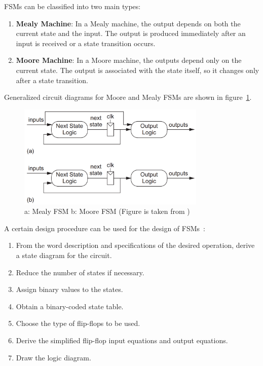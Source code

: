 \noindent
FSMs can be classified into two main types:

\begin{enumerate}
    \item \textbf{Mealy Machine}: In a Mealy machine, the output depends on both the current state and the input. The output is produced immediately after an input is received or a state transition occurs. 
    
    \item \textbf{Moore Machine}: In a Moore machine, the outputs depend only on the current state. The output is associated with the state itself, so it changes only after a state transition.
\end{enumerate}

\noindent
Generalized circuit diagrams for Moore and Mealy FSMs are shown in figure~\ref{fig:general_fsm}.

\begin{figure}[H]
    \centering
    \includegraphics[width=0.8\textwidth]{Figures/general fsm diagrams.png}
    \caption{a: Mealy FSM b: Moore FSM (Figure is taken from \cite{CMOS_VLSI_design})}
    \label{fig:general_fsm}
\end{figure}


\noindent
A certain design procedure can be used for the design of FSMs~\cite{digital_design}:

\begin{enumerate}
  \item From the word description and specifications of the desired operation, derive a state diagram for the circuit.
  \item Reduce the number of states if necessary.
  \item Assign binary values to the states.
  \item Obtain a binary-coded state table.
  \item Choose the type of flip-flops to be used.
  \item Derive the simplified flip-flop input equations and output equations.
  \item Draw the logic diagram.
\end{enumerate}


